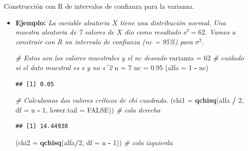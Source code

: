 \documentclass[
  9pt,
  ignorenonframetext,
]{beamer}
\newenvironment{Shaded}{\begin{snugshade}}{\end{snugshade}}
\newcommand{\CommentTok}[1]{\textcolor[rgb]{0.56,0.35,0.01}{\textit{#1}}}
\newcommand{\DataTypeTok}[1]{\textcolor[rgb]{0.13,0.29,0.53}{#1}}
\newcommand{\DecValTok}[1]{\textcolor[rgb]{0.00,0.00,0.81}{#1}}
\newcommand{\FloatTok}[1]{\textcolor[rgb]{0.00,0.00,0.81}{#1}}
\newcommand{\KeywordTok}[1]{\textcolor[rgb]{0.13,0.29,0.53}{\textbf{#1}}}
\newcommand{\NormalTok}[1]{#1}
\newcommand{\OperatorTok}[1]{\textcolor[rgb]{0.81,0.36,0.00}{\textbf{#1}}}
\newcommand{\OtherTok}[1]{\textcolor[rgb]{0.56,0.35,0.01}{#1}}
\newcommand{\StringTok}[1]{\textcolor[rgb]{0.31,0.60,0.02}{#1}}
\begin{document}
\begin{frame}[fragile]{Construcción con R de intervalos de confianza
para la varianza.}
\protect\hypertarget{construccion-con-r-de-intervalos-de-confianza-para-la-varianza.}{}

\begin{itemize}
\item
  \textbf{Ejemplo:} \emph{La variable aleatoria \(X\) tiene una
  distribución normal. Una muestra aleatoria de 7 valores de \(X\) dio
  como resultado \(s^2 = 62\). Vamos a construir con R un intervalo de
  confianza (nc = 95\%) para \(\sigma^2\)}.\scriptsize

\begin{Shaded}
\begin{Highlighting}[]
\CommentTok{# Estos son los valores muestrales y el nc deseado}
\NormalTok{varianza =}\StringTok{ }\DecValTok{62} \CommentTok{# cuidado si el dato muestral es s y no s^2}
\NormalTok{n =}\StringTok{ }\DecValTok{7}
\NormalTok{nc =}\StringTok{ }\FloatTok{0.95}
\NormalTok{(}\DataTypeTok{alfa =} \DecValTok{1} \OperatorTok{-}\StringTok{ }\NormalTok{nc)}
\end{Highlighting}
\end{Shaded}

\begin{verbatim}
## [1] 0.05
\end{verbatim}

\begin{Shaded}
\begin{Highlighting}[]
\CommentTok{# Calculamos dos valores críticos de chi cuadrado.}
\NormalTok{(}\DataTypeTok{chi1 =} \KeywordTok{qchisq}\NormalTok{(alfa }\OperatorTok{/}\StringTok{ }\DecValTok{2}\NormalTok{, }\DataTypeTok{df =}\NormalTok{ n }\OperatorTok{-}\StringTok{ }\DecValTok{1}\NormalTok{, }\DataTypeTok{lower.tail =} \OtherTok{FALSE}\NormalTok{)) }\CommentTok{# cola derecha}
\end{Highlighting}
\end{Shaded}

\begin{verbatim}
## [1] 14.44938
\end{verbatim}

\begin{Shaded}
\begin{Highlighting}[]
\NormalTok{(}\DataTypeTok{chi2 =} \KeywordTok{qchisq}\NormalTok{(alfa}\OperatorTok{/}\DecValTok{2}\NormalTok{, }\DataTypeTok{df =}\NormalTok{ n }\OperatorTok{-}\StringTok{ }\DecValTok{1}\NormalTok{)) }\CommentTok{# cola izquierda}
\end{Highlighting}
\end{Shaded}


\end{itemize}
\end{frame}
\end{document}
